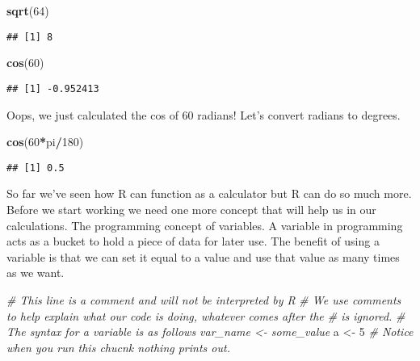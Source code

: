 \documentclass[]{book}
\newenvironment{Shaded}{\begin{snugshade}}{\end{snugshade}}
\newcommand{\KeywordTok}[1]{\textcolor[rgb]{0.13,0.29,0.53}{\textbf{#1}}}
\newcommand{\DecValTok}[1]{\textcolor[rgb]{0.00,0.00,0.81}{#1}}
\newcommand{\StringTok}[1]{\textcolor[rgb]{0.31,0.60,0.02}{#1}}
\newcommand{\CommentTok}[1]{\textcolor[rgb]{0.56,0.35,0.01}{\textit{#1}}}
\newcommand{\OperatorTok}[1]{\textcolor[rgb]{0.81,0.36,0.00}{\textbf{#1}}}
\newcommand{\NormalTok}[1]{#1}
\begin{document}
\begin{Shaded}
\begin{Highlighting}[]
\KeywordTok{sqrt}\NormalTok{(}\DecValTok{64}\NormalTok{)}
\end{Highlighting}
\end{Shaded}

\begin{verbatim}
## [1] 8
\end{verbatim}

\begin{Shaded}
\begin{Highlighting}[]
\KeywordTok{cos}\NormalTok{(}\DecValTok{60}\NormalTok{)}
\end{Highlighting}
\end{Shaded}

\begin{verbatim}
## [1] -0.952413
\end{verbatim}

Oops, we just calculated the cos of 60 radians! Let's convert radians to
degrees.

\begin{Shaded}
\begin{Highlighting}[]
\KeywordTok{cos}\NormalTok{(}\DecValTok{60}\OperatorTok{*}\NormalTok{pi}\OperatorTok{/}\DecValTok{180}\NormalTok{)}
\end{Highlighting}
\end{Shaded}

\begin{verbatim}
## [1] 0.5
\end{verbatim}

So far we've seen how R can function as a calculator but R can do so
much more. Before we start working we need one more concept that will
help us in our calculations. The programming concept of variables. A
variable in programming acts as a bucket to hold a piece of data for
later use. The benefit of using a variable is that we can set it equal
to a value and use that value as many times as we want.

\begin{Shaded}
\begin{Highlighting}[]
\CommentTok{# This line is a comment and will not be interpreted by R}
\CommentTok{# We use comments to help explain what our code is doing, whatever comes after the # is ignored.}
\CommentTok{# The syntax for a variable is as follows var_name <- some_value}
\NormalTok{a <-}\StringTok{ }\DecValTok{5}
\CommentTok{# Notice when you run this chucnk nothing prints out.}
\end{Highlighting}
\end{Shaded}
\end{document}
